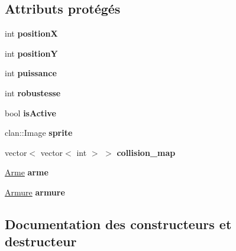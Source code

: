 \subsection*{Attributs protégés}
\begin{DoxyCompactItemize}
\item 
\hypertarget{classPersonnage_af599fcbd1767fbf8ef5d1c90a8eaa638}{}int {\bfseries position\+X}\label{classPersonnage_af599fcbd1767fbf8ef5d1c90a8eaa638}

\item 
\hypertarget{classPersonnage_a02842b34a8c93f54772242e40e4c5a8a}{}int {\bfseries position\+Y}\label{classPersonnage_a02842b34a8c93f54772242e40e4c5a8a}

\item 
\hypertarget{classPersonnage_ac53717e24a91a7698955d506c092d2b7}{}int {\bfseries puissance}\label{classPersonnage_ac53717e24a91a7698955d506c092d2b7}

\item 
\hypertarget{classPersonnage_ab3287f35ae3106f42eb195cc60371dae}{}int {\bfseries robustesse}\label{classPersonnage_ab3287f35ae3106f42eb195cc60371dae}

\item 
\hypertarget{classPersonnage_aa724215ef4023e5444f7cdf6a6a3a8f4}{}bool {\bfseries is\+Active}\label{classPersonnage_aa724215ef4023e5444f7cdf6a6a3a8f4}

\item 
\hypertarget{classPersonnage_adf517de2c6d5f39fde55136bf8a031ea}{}clan\+::\+Image {\bfseries sprite}\label{classPersonnage_adf517de2c6d5f39fde55136bf8a031ea}

\item 
\hypertarget{classPersonnage_a5ab0e54e773a08c5efb042dfcbab9251}{}vector$<$ vector$<$ int $>$ $>$ {\bfseries collision\+\_\+map}\label{classPersonnage_a5ab0e54e773a08c5efb042dfcbab9251}

\item 
\hypertarget{classPersonnage_a538199d18a1705e6511c5f17013efd16}{}\hyperlink{classArme}{Arme} {\bfseries arme}\label{classPersonnage_a538199d18a1705e6511c5f17013efd16}

\item 
\hypertarget{classPersonnage_a0b1b3eaed5cd4f3721b22645db7833de}{}\hyperlink{classArmure}{Armure} {\bfseries armure}\label{classPersonnage_a0b1b3eaed5cd4f3721b22645db7833de}

\end{DoxyCompactItemize}


\subsection{Documentation des constructeurs et destructeur}
\hypertarget{classPersonnage_abec36eb0310adc71f3375297fc590c65}{}
